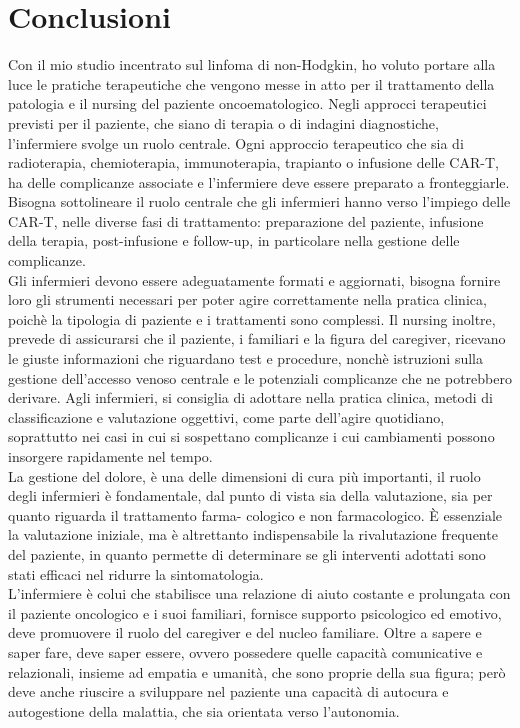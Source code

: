 \section*{Conclusioni}

Con il mio studio incentrato sul linfoma di non-Hodgkin, ho voluto portare alla luce le pratiche terapeutiche 
che vengono messe in atto per il trattamento della patologia e il nursing del paziente oncoematologico. 
Negli approcci terapeutici previsti per il paziente, che siano di terapia o di indagini diagnostiche, l'infermiere 
svolge un ruolo centrale.
Ogni approccio terapeutico che sia di radioterapia, chemioterapia, immunoterapia, trapianto o infusione delle CAR-T, 
ha delle complicanze associate e l'infermiere deve essere preparato a fronteggiarle. 
Bisogna sottolineare il ruolo centrale che gli infermieri hanno verso l’impiego delle CAR-T, nelle diverse fasi 
di trattamento: preparazione del paziente, infusione della terapia, post-infusione e follow-up, in particolare nella 
gestione delle complicanze.\\
Gli infermieri devono essere adeguatamente formati e aggiornati, bisogna fornire loro gli strumenti necessari per poter 
agire correttamente nella pratica clinica, poichè la tipologia di paziente e i trattamenti sono complessi. 
Il nursing inoltre, prevede di assicurarsi che il paziente, i familiari e la figura del caregiver, ricevano le 
giuste informazioni che riguardano test e procedure, nonchè istruzioni sulla gestione dell’accesso venoso centrale e le
potenziali complicanze che ne potrebbero derivare.
Agli infermieri, si consiglia di adottare nella pratica clinica, metodi di classificazione e valutazione oggettivi, 
come parte dell’agire quotidiano, soprattutto nei casi in cui si sospettano complicanze i
cui cambiamenti possono insorgere rapidamente nel tempo.\\
La gestione del dolore, è una delle dimensioni di cura più importanti, il ruolo degli infermieri è
fondamentale, dal punto di vista sia della valutazione, sia per quanto riguarda il trattamento farma-
cologico e non farmacologico. 
È essenziale la valutazione iniziale, ma è altrettanto indispensabile la rivalutazione
frequente del paziente, in quanto permette di determinare se gli interventi adottati sono stati
efficaci nel ridurre la sintomatologia.\\
L’infermiere è colui che stabilisce una relazione di aiuto costante e prolungata con il paziente 
oncologico e i suoi familiari, fornisce supporto psicologico ed emotivo, deve promuovere il ruolo del
caregiver e del nucleo familiare. Oltre a sapere e saper fare, deve saper essere, ovvero possedere quelle 
capacità comunicative e relazionali, insieme ad empatia e umanità, che sono proprie della sua figura;
però deve anche riuscire a sviluppare nel paziente una capacità di autocura e autogestione della malattia, 
che sia orientata verso l’autonomia.
